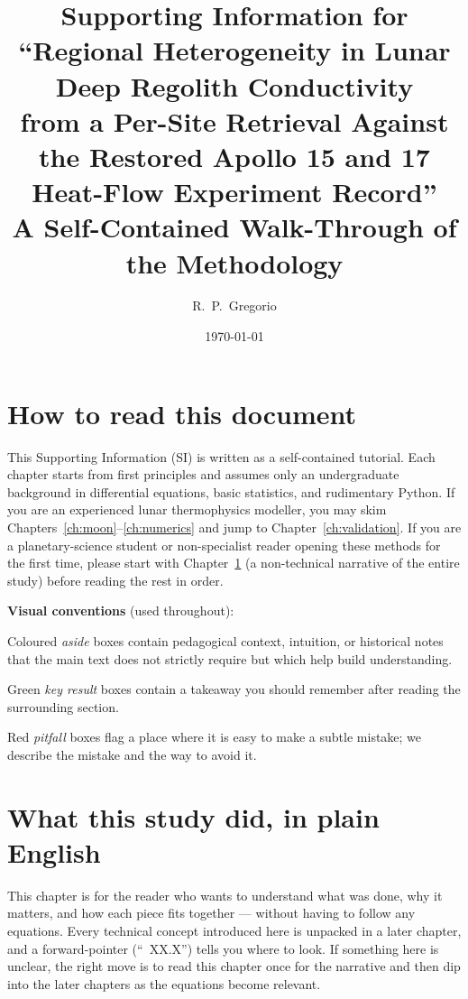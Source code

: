 \documentclass[11pt]{report}
\title{\bfseries Supporting Information for\\
``Regional Heterogeneity in Lunar Deep Regolith Conductivity\\
from a Per-Site Retrieval Against the Restored Apollo 15 and 17\\
Heat-Flow Experiment Record''\\[6pt]
\large A Self-Contained Walk-Through of the Methodology}
\author{R.~P.~Gregorio}
\date{\today}
\begin{document}
\maketitle
\tableofcontents
\clearpage

\chapter*{How to read this document}

This Supporting Information (SI) is written as a self-contained tutorial.
Each chapter starts from first principles and assumes only an undergraduate
background in differential equations, basic statistics, and rudimentary
Python. If you are an experienced lunar thermophysics modeller, you may
skim Chapters~\ref{ch:moon}--\ref{ch:numerics} and jump to
Chapter~\ref{ch:validation}. If you are a planetary-science student or
non-specialist reader opening these methods for the first time, please
start with Chapter~\ref{ch:plain} (a non-technical narrative of the
entire study) before reading the rest in order.

\medskip\noindent\textbf{Visual conventions} (used throughout):

\begin{aside}[Aside]
Coloured \emph{aside} boxes contain pedagogical context, intuition, or
historical notes that the main text does not strictly require but which
help build understanding.
\end{aside}

\begin{key}
Green \emph{key result} boxes contain a takeaway you should remember
after reading the surrounding section.
\end{key}

\begin{warn}[Pitfall]
Red \emph{pitfall} boxes flag a place where it is easy to make a
subtle mistake; we describe the mistake and the way to avoid it.
\end{warn}

\chapter{What this study did, in plain English}\label{ch:plain}

This chapter is for the reader who wants to understand what was
done, why it matters, and how each piece fits together --- without
having to follow any equations. Every technical concept introduced
here is unpacked in a later chapter, and a forward-pointer
(``\textsection{}~XX.X'') tells you where to look. If something here
is unclear, the right move is to read this chapter once for the
narrative and then dip into the later chapters as the equations
become relevant.
\end{document}
